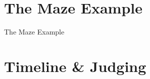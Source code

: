 \documentclass[aspectratio=169]{beamer}
\begin{document}
\section{The Maze Example}

\begin{frame}{The Maze Example}
\end{frame}

\section{Timeline \& Judging}
\end{document}
